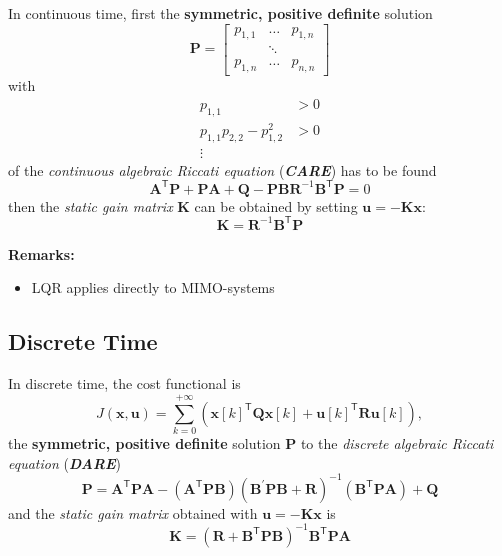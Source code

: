 In continuous time, first the \textbf{symmetric, positive definite} solution
\begin{equation*}
    \mathbf{P}=\begin{bmatrix} p_{1,1} & \dots  & p_{1,n} \\
                        & \ddots &         \\
                p_{1,n} & \dots  & p_{n,n}
    \end{bmatrix}
\end{equation*}
with
\begin{align*}
    p_{1,1}                   & >0 \\
    p_{1,1}p_{2,2} -p_{1,2}^2 & >0 \\
    \vdots
\end{align*}
of the \textit{continuous algebraic Riccati equation} (\textbf{\textit{CARE}}) has to be found
\noindent\begin{equation*}
    \mathbf{A}^{\mathsf{T}} \mathbf{P}+\mathbf{PA}+\mathbf{Q}-\mathbf{PBR}^{-1}\mathbf{B}^{\mathsf{T}} \mathbf{P}=0
\end{equation*}
then the \textit{static gain matrix} $\mathbf{K}$ can be obtained by setting $\mathbf{u} = -\mathbf{Kx}$:
\noindent\begin{equation*}
    \mathbf{K}=\mathbf{R}^{-1}\mathbf{B}^{\mathsf{T}} \mathbf{P}
\end{equation*}

\textbf{Remarks:}

\begin{itemize}
    \item LQR applies directly to MIMO-systems
\end{itemize}

\newpar{}
\textbf{} 


\subsection{Discrete Time}
In discrete time, the cost functional is
\noindent\begin{equation*}
    J(\mathbf{x,u})=\sum_{k=0}^{+\infty}\left({\mathbf{x}[k]}^{\mathsf{T}} \mathbf{Qx}[k]+{\mathbf{u}[k]}^{\mathsf{T}} \mathbf{Ru}[k]\right),
\end{equation*}
the \textbf{symmetric, positive definite} solution $\mathbf{P}$ to the \textit{discrete algebraic Riccati equation} (\textbf{\textit{DARE}})
\noindent\begin{equation*}
    \mathbf{P}=\mathbf{A}^{\mathsf{T}} \mathbf{PA}-(\mathbf{A}^{\mathsf{T}} \mathbf{PB}){(\mathbf{B}^{\prime}\mathbf{PB}+\mathbf{R})}^{-1}(\mathbf{B}^{\mathsf{T}} \mathbf{PA})+\mathbf{Q}
\end{equation*}
and the \textit{static gain matrix} obtained with $\mathbf{u} = -\mathbf{Kx}$ is
\noindent\begin{equation*}
    \mathbf{K}={(\mathbf{R}+\mathbf{B}^{\mathsf{T}} \mathbf{PB})}^{-1}\mathbf{B}^{\mathsf{T}} \mathbf{PA}
\end{equation*}

